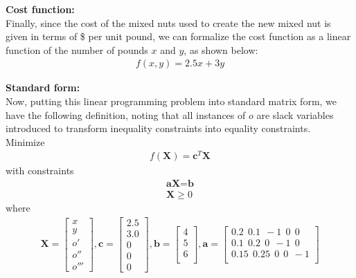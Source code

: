\documentclass[11pt]{article}
\begin{document}
\begin{sol}
\textbf{Cost function:} \\
Finally, since the cost of the mixed nuts used to create the new mixed nut is given in terms of \$ per unit pound, we can formalize the cost function as a linear function of the number of pounds $x$ and $y$, as shown below:
\begin{eqnarray*}
f(x,y) = 2.5x + 3y
\end{eqnarray*}

\textbf{Standard form:} \\
Now, putting this linear programming problem into standard matrix form, we have the following definition, noting that all instances of $o$ are slack variables introduced to transform inequality constraints into equality constraints.  \\

Minimize 
\begin{eqnarray*}
f(\textbf{X}) = \textbf{c}^{T}\textbf{X}
\end{eqnarray*}
with constraints 
\begin{eqnarray*}
\textbf{aX} = \textbf{b} \\
\textbf{X} \geq 0
\end{eqnarray*}
where
\begin{eqnarray*}
\textbf{X} = \begin{bmatrix}x \\y\\o' \\ o'' \\ o''' \end{bmatrix}, 
\textbf{c} = \begin{bmatrix}2.5 \\3.0\\ 0 \\ 0 \\ 0 \end{bmatrix}, 
\textbf{b} = \begin{bmatrix}4 \\5\\6\\ \end{bmatrix}, 
\textbf{a} = \begin{bmatrix}0.2 \ \  0.1\ \ -1 \ \ 0\ \ 0\\0.1 \ \ 0.2\ \ 0\ \ -1\ \ 0\\ 0.15 \  \ 0.25\ \ 0\ \ 0\ \ -1 \\\end{bmatrix}\\
\end{eqnarray*}
\end{sol}
\end{document}
